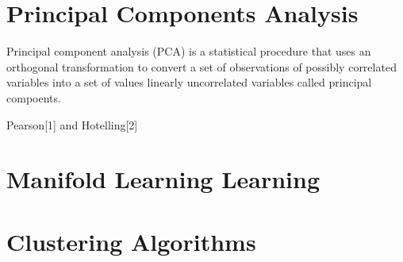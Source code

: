 \section{Principal Components Analysis}

Principal component analysis (PCA) is a statistical procedure that uses an orthogonal transformation to convert a set of observations of possibly correlated variables into a set of values linearly uncorrelated variables called principal compoents.

Pearson[1] and Hotelling[2]

\section{Manifold Learning Learning}

\section{Clustering Algorithms}
